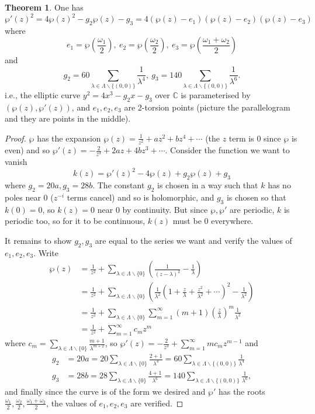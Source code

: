 \documentclass{article}
\newcommand{\C}{\mathbb{C}}
\theoremstyle{definition}
\newtheorem{thm}[defn]{Theorem}
\begin{document}
\begin{thm}
One has
\[
\wp'(z)^2=4\wp(z)^2-g_2\wp(z)-g_3=4(\wp(z)-e_1)(\wp(z)-e_2)(\wp(z)-e_3)
\]
where
\[
e_1=\wp\left(\frac{\omega_1}{2}\right),\ e_2=\wp\left(\frac{\omega_2}{2}\right),\ e_3=\wp\left(\frac{\omega_1+\omega_2}{2}\right)
\]
and
\[
g_2=60\sum_{\lambda\in\Lambda\backslash\{(0,0)\}}\frac{1}{\lambda^4},\ g_3=140\sum_{\lambda\in\Lambda\backslash\{(0,0)\}}\frac{1}{\lambda^6}.
\]
i.e., the elliptic curve $y^2=4x^3-g_2x-g_3$ over $\C$ is parameterised by $(\wp(z),\wp'(z))$, and $e_1,e_2,e_3$ are 2-torsion points (picture the parallelogram and they are points in the middle).
\end{thm}
\begin{proof}
$\wp$ has the expansion $\wp(z)=\frac{1}{z^2}+az^2+bz^4+\cdots$ (the $z$ term is 0 since $\wp$ is even) and so $\wp'(z)=-\frac{2}{z^3}+2az+4bz^3+\cdots$. Consider the function we want to vanish
\[
k(z)=\wp'(z)^2-4\wp(z)+g_2\wp(z)+g_3
\]
where $g_2=20a,g_3=28b$. The constant $g_2$ is chosen in a way such that $k$ has no poles near 0 ($z^{-i}$ terms cancel) and so is holomorphic, and $g_3$ is chosen so that $k(0)=0$, so $k(z)=0$ near 0 by continuity. But since $\wp,\wp'$ are periodic, $k$ is periodic too, so for it to be continuous, $k(z)$ must be 0 everywhere.

It remains to show $g_2,g_3$ are equal to the series we want and verify the values of $e_1,e_2,e_3$. Write
\[
\begin{aligned}
\wp(z)&=\frac{1}{z^2}+\sum_{\lambda\in\Lambda\backslash\{0\}} \left(\frac{1}{(z-\lambda)^2}-\frac{1}{\lambda}\right)\\
&=\frac{1}{z^2}+\sum_{\lambda\in\Lambda\backslash\{0\}} \left(\frac{1}{\lambda^2}\left(1+\frac{z}{\lambda}+\frac{z^2}{\lambda^2}+\cdots\right)^2-\frac{1}{\lambda^2}\right)\\
&=\frac{1}{z^2}+\sum_{\lambda\in\Lambda\backslash\{0\}}\sum_{m=1}^\infty (m+1)\left(\frac{z}{\lambda}\right)^m\frac{1}{\lambda^2}\\
&=\frac{1}{z^2}+\sum_{m=1}^\infty c_mz^m
\end{aligned}
\]
where $c_m=\sum_{\lambda\in\Lambda\backslash\{0\}}\frac{m+1}{\lambda^{m+2}}$,
so $\wp'(z)=-\frac{2}{z^3}+\sum_{m=1}^\infty mc_mz^{m-1}$ and
\[
\begin{aligned}
g_2&=20a=20\sum_{\lambda\in\Lambda\backslash\{0\}}\frac{2+1}{\lambda^4}=60\sum_{\lambda\in\Lambda\backslash\{(0,0)\}}\frac{1}{\lambda^4} \\
g_3&=28b=28\sum_{\lambda\in\Lambda\backslash\{0\}}\frac{4+1}{\lambda^6}=140\sum_{\lambda\in\Lambda\backslash\{(0,0)\}}\frac{1}{\lambda^6},
\end{aligned}
\]
and finally since the curve is of the form we desired and $\wp'$ has the roots $\frac{\omega_1}{2},\frac{\omega_2}{2},\frac{\omega_1+\omega_2}{2}$, the values of $e_1,e_2,e_3$ are verified.
\end{proof}
\end{document}
